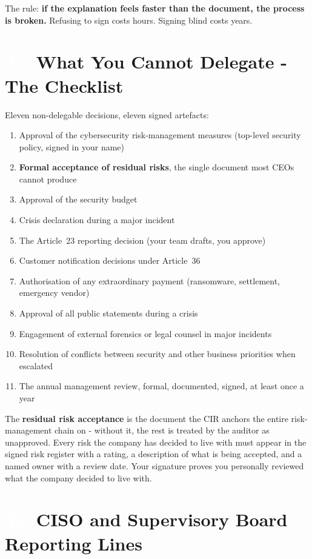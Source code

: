 \documentclass[11pt,a4paper,twoside]{book}
\newcommand{\lessontag}[1]{%
  \texorpdfstring{%
    \setlength{\fboxsep}{3pt}\colorbox{nisd2blue}{\textcolor{white}{\footnotesize\bfseries #1}}\quad%
  }{Lesson #1\ }%
}
\begin{document}
The rule: \textbf{if the explanation feels faster than the document, the process is broken.} Refusing to sign costs hours. Signing blind costs years.

\section{\lessontag{3.5}What You Cannot Delegate - The Checklist}

Eleven non-delegable decisions, eleven signed artefacts:

\begin{enumerate}
  \item Approval of the cybersecurity risk-management measures (top-level security policy, signed in your name)
  \item \textbf{Formal acceptance of residual risks}, the single document most CEOs cannot produce
  \item Approval of the security budget
  \item Crisis declaration during a major incident
  \item The Article~23 reporting decision (your team drafts, you approve)
  \item Customer notification decisions under Article~36
  \item Authorisation of any extraordinary payment (ransomware, settlement, emergency vendor)
  \item Approval of all public statements during a crisis
  \item Engagement of external forensics or legal counsel in major incidents
  \item Resolution of conflicts between security and other business priorities when escalated
  \item The annual management review, formal, documented, signed, at least once a year
\end{enumerate}

\begin{warningbox}
The \textbf{residual risk acceptance} is the document the CIR anchors the entire risk-management chain on - without it, the rest is treated by the auditor as unapproved. Every risk the company has decided to live with must appear in the signed risk register with a rating, a description of what is being accepted, and a named owner with a review date. Your signature proves you personally reviewed what the company decided to live with.
\end{warningbox}

\section{\lessontag{3.6}CISO and Supervisory Board Reporting Lines}
\end{document}
